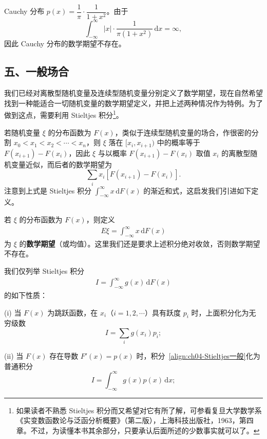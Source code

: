 \documentclass[../../main.tex]{subfiles}
\begin{document}
\begin{example}\label{example:ch04-期望-Cauchy}
Cauchy 分布 $p(x)=\dfrac{1}{\pi}\cdot\dfrac{1}{1+x^2}$。由于
\[
\int_{-\infty}^{\infty}|x|\cdot\frac{1}{\pi(1+x^2)}\,\mathrm{d}x=\infty,
\]
因此 Cauchy 分布的数学期望不存在。
\end{example}

\subsection*{五、一般场合}

我们已经对离散型随机变量及连续型随机变量分别定义了数学期望，现在自然希望找到一种能适合一切随机变量的数学期望定义，并把上述两种情况作为特例。为了做到这点，需要利用 Stieltjes 积分\footnote{如果读者不熟悉 Stieltjes 积分而又希望对它有所了解，可参看复旦大学数学系《实变数函数论与泛函分析概要》（第二版），上海科技出版社，1963，第四章。不过，为读懂本书其余部分，只要承认后面所述的少数事实就可以了。}。

若随机变量 $\xi$ 的分布函数为 $F(x)$，类似于连续型随机变量的场合，作很密的分割 $x_0<x_1<x_2<\cdots<x_n$，则 $\xi$ 落在 $[x_i,x_{i+1})$ 中的概率等于 $F(x_{i+1})-F(x_i)$，因此 $\xi$ 与以概率 $F(x_{i+1})-F(x_i)$ 取值 $x_i$ 的离散型随机变量近似，而后者的数学期望为
\[
\sum_i x_i[F(x_{i+1})-F(x_i)].
\]
注意到上式是 Stieltjes 积分 $\int_{-\infty}^{\infty} x\,\mathrm{d}F(x)$ 的渐近和式，这启发我们引进如下定义。

\begin{definition}[一般随机变量的数学期望]\label{definition:ch04-Stieltjes期望}
若 $\xi$ 的分布函数为 $F(x)$，则定义
\begin{align}
E\xi=\int_{-\infty}^{\infty} x\,\mathrm{d}F(x)\label{align:ch04-Stieltjes期望}
\end{align}
为 $\xi$ 的\textbf{数学期望}（或均值）。这里我们还是要求上述积分绝对收敛，否则数学期望不存在。
\end{definition}

我们仅列举 Stieltjes 积分
\begin{align}
I=\int_{-\infty}^{\infty} g(x)\,\mathrm{d}F(x)\label{align:ch04-Stieltjes一般}
\end{align}
的如下性质：

(i) 当 $F(x)$ 为跳跃函数，在 $x_i$（$i=1,2,\cdots$）具有跃度 $p_i$ 时，上面积分化为无穷级数
\[
I=\sum_i g(x_i)p_i;
\]

(ii) 当 $F(x)$ 存在导数 $F'(x)=p(x)$ 时，积分~\eqref{align:ch04-Stieltjes一般}化为普通积分
\[
I=\int_{-\infty}^{\infty} g(x)p(x)\,\mathrm{d}x;
\]
\end{document}
